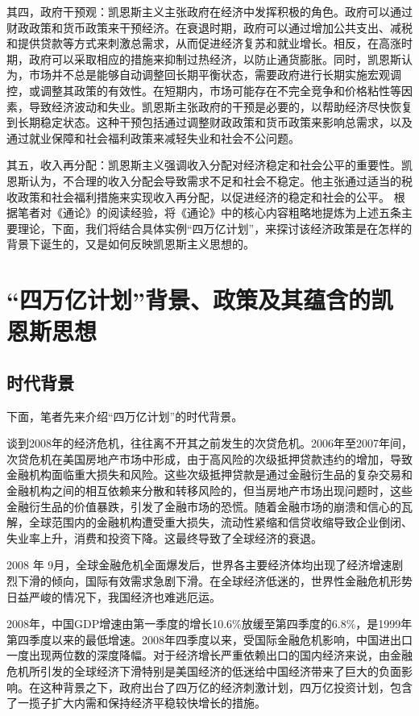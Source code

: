 \documentclass[UTF8,openany]{ctexbook}
\begin{document}
其四，政府干预观：凯恩斯主义主张政府在经济中发挥积极的角色。政府可以通过财政政策和货币政策来干预经济。在衰退时期，政府可以通过增加公共支出、减税和提供贷款等方式来刺激总需求，从而促进经济复苏和就业增长。相反，在高涨时期，政府可以采取相应的措施来抑制过热经济，以防止通货膨胀。同时，凯恩斯认为，市场并不总是能够自动调整回长期平衡状态，需要政府进行长期实施宏观调控，或调整其政策的有效性。在短期内，市场可能存在不完全竞争和价格粘性等因素，导致经济波动和失业。凯恩斯主张政府的干预是必要的，以帮助经济尽快恢复到长期稳定状态。这种干预包括通过调整财政政策和货币政策来影响总需求，以及通过就业保障和社会福利政策来减轻失业和社会不公问题。

其五，收入再分配：凯恩斯主义强调收入分配对经济稳定和社会公平的重要性。凯恩斯认为，不合理的收入分配会导致需求不足和社会不稳定。他主张通过适当的税收政策和社会福利措施来实现收入再分配，以促进经济的稳定和社会的公平。
根据笔者对《通论》的阅读经验，将《通论》中的核心内容粗略地提炼为上述五条主要理论，下面，我们将结合具体实例“四万亿计划”，来探讨该经济政策是在怎样的背景下诞生的，又是如何反映凯恩斯主义思想的。


\chapter{“四万亿计划”背景、政策及其蕴含的凯恩斯思想}
\thispagestyle{fancy}
\section{时代背景}
下面，笔者先来介绍“四万亿计划”的时代背景。

谈到2008年的经济危机，往往离不开其之前发生的次贷危机。2006年至2007年间，次贷危机在美国房地产市场中形成，由于高风险的次级抵押贷款违约的增加，导致金融机构面临重大损失和风险。这些次级抵押贷款是通过金融衍生品的复杂交易和金融机构之间的相互依赖来分散和转移风险的，但当房地产市场出现问题时，这些金融衍生品的价值暴跌，引发了金融市场的恐慌。随着金融市场的崩溃和信心的瓦解，全球范围内的金融机构遭受重大损失，流动性紧缩和信贷收缩导致企业倒闭、失业率上升，消费和投资下降。这最终导致了全球经济的衰退。

2008 年 9月，全球金融危机全面爆发后，世界各主要经济体均出现了经济增速剧烈下滑的倾向，国际有效需求急剧下滑。在全球经济低迷的，世界性金融危机形势日益严峻的情况下，我国经济也难逃厄运。\cite{bi:1}

2008年，中国GDP增速由第一季度的增长10.6\%放缓至第四季度的6.8\%，是1999年第四季度以来的最低增速。2008年四季度以来，受国际金融危机影响，中国进出口一度出现两位数的深度降幅。对于经济增长严重依赖出口的国内经济来说，由金融危机所引发的全球经济下滑特别是美国经济的低迷给中国经济带来了巨大的负面影响。在这种背景之下，政府出台了四万亿的经济刺激计划，四万亿投资计划，包含了一揽子扩大内需和保持经济平稳较快增长的措施。\cite{bi:2}
\end{document}
